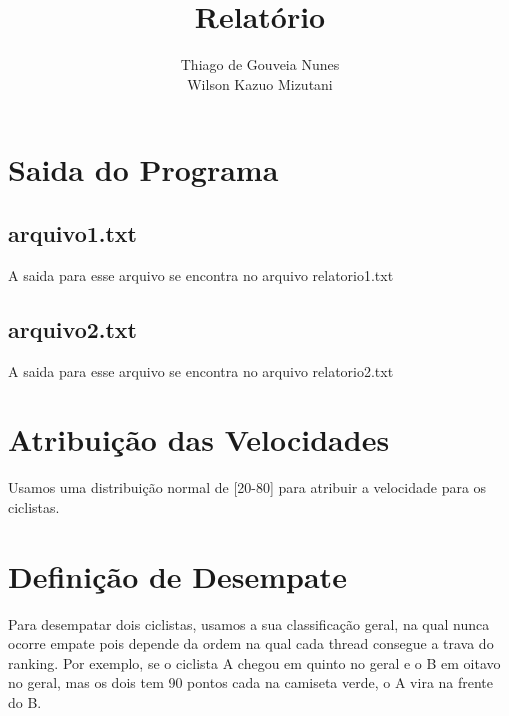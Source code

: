 \documentclass[a4paper,11pt]{article}
\title{Relatório}
\author{Thiago de Gouveia Nunes \\ Wilson Kazuo Mizutani}
\begin{document}
\maketitle
\tableofcontents

\section{Saida do Programa}
\subsection{arquivo1.txt}
  A saida para esse arquivo se encontra no arquivo relatorio1.txt
\subsection{arquivo2.txt}
  A saida para esse arquivo se encontra no arquivo relatorio2.txt
\section{Atribuição das Velocidades}
  Usamos uma distribuição normal de [20-80] para atribuir a velocidade para os ciclistas.
\section{Definição de Desempate}
  Para desempatar dois ciclistas, usamos a sua classificação geral, na qual nunca ocorre empate pois depende da ordem na qual cada thread
consegue a trava do ranking. Por exemplo, se o ciclista A chegou em quinto no geral e o B em oitavo no geral, mas os dois tem 90 pontos
cada na camiseta verde, o A vira na frente do B.
\end{document}
